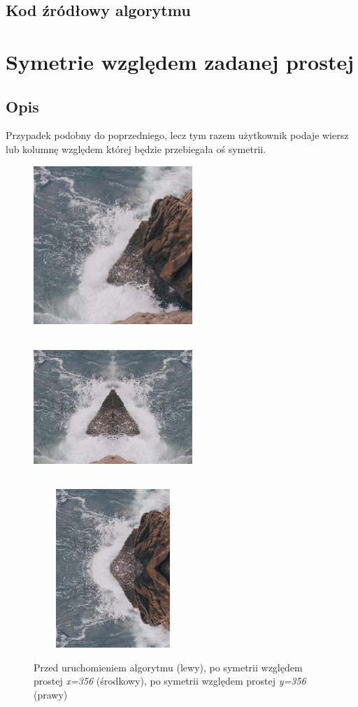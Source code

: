 \documentclass[a4paper,12pt]{book}
\begin{document}
\subsection*{Kod źródłowy algorytmu}

\section{Symetrie względem zadanej prostej}
\subsection*{Opis}
Przypadek podobny do poprzedniego, lecz tym razem użytkownik podaje wiersz lub kolumnę względem której będzie przebiegała oś symetrii. 

\begin{figure}[H]
	\caption{Przed uruchomieniem algorytmu (lewy), po symetrii względem prostej \textit{x=356} (środkowy), po symetrii względem prostej \textit{y=356} (prawy)}
	\includegraphics[width=6cm, height=6cm]{sea-unmodified.jpg}
	\includegraphics[width=6cm, height=6cm]{4-4/x-symmetry-sea-356.png}
	\includegraphics[width=6cm, height=6cm]{4-4/y-symmetry-sea-356.png}
\end{figure}
\end{document}
